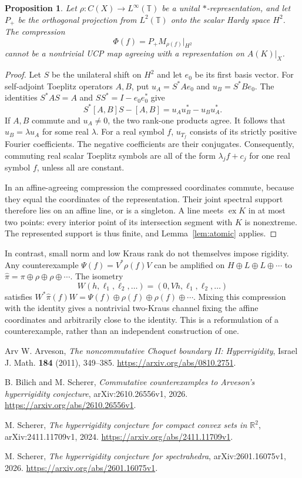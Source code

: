 \documentclass[11pt,letterpaper]{amsart}
\newtheorem{proposition}[theorem]{Proposition}
\theoremstyle{definition}
\theoremstyle{remark}
\numberwithin{equation}{section}
\DeclareMathOperator{\ex}{ex}
\newcommand{\R}{\mathbb R}
\begin{document}
\begin{proposition}\label{nonwalsh:prop:toeplitz}
Let $\rho:C(X)\to L^\infty(\mathbb T)$ be a unital
$*$-representation, and let $P_+$ be the orthogonal projection from
$L^2(\mathbb T)$ onto the scalar Hardy space $H^2$. The compression
\[
                   \Phi(f)=P_+M_{\rho(f)}|_{H^2}
\]
cannot be a nontrivial UCP map agreeing with a representation on
$A(K)|_X$.
\end{proposition}
\begin{proof}
Let $S$ be the unilateral shift on $H^2$ and let $e_0$ be its first
basis vector. For self-adjoint Toeplitz operators $A,B$, put
$u_A=S^*Ae_0$ and $u_B=S^*Be_0$. The identities $S^*AS=A$ and
$SS^*=I-e_0e_0^*$ give
\[
                  S^*[A,B]S-[A,B]=u_Au_B^*-u_Bu_A^*.
\]
If $A,B$ commute and $u_A\ne0$, the two rank-one products agree.
It follows that $u_B=\lambda u_A$ for some real $\lambda$.
For a real symbol $f$, $u_{T_f}$ consists of its strictly positive
Fourier coefficients. The negative coefficients are their conjugates.
Consequently, commuting real scalar Toeplitz symbols are all of the
form $\lambda_jf+c_j$ for one real symbol $f$, unless all are constant.

In an affine-agreeing compression the compressed coordinates commute,
because they equal the coordinates of the representation. Their joint
spectral support therefore lies on an affine line, or is a singleton.
A line meets $\ex K$ in at most two points: every interior point of
its intersection segment with $K$ is nonextreme. The represented
support is thus finite, and Lemma~\ref{lem:atomic} applies.
\end{proof}

In contrast, small norm and low Kraus rank do not themselves impose
rigidity. Any counterexample $\Psi(f)=V^*\rho(f)V$ can be amplified
on $H\oplus L\oplus L\oplus\cdots$ to
$\widehat\pi=\pi\oplus\rho\oplus\rho\oplus\cdots$. The isometry
\[
             W(h,\ell_1,\ell_2,\ldots)=(0,Vh,\ell_1,\ell_2,\ldots)
\]
satisfies
$W^*\widehat\pi(f)W=\Psi(f)\oplus\rho(f)\oplus\rho(f)\oplus\cdots$.
Mixing this compression with the identity gives a nontrivial two-Kraus
channel fixing the affine coordinates and arbitrarily close to the
identity. This is a reformulation of a counterexample, rather than an
independent construction of one.

\begin{thebibliography}{Arv}
W. Arveson, \emph{The noncommutative Choquet boundary II: Hyperrigidity},
Israel J. Math. \textbf{184} (2011), 349--385.
\url{https://arxiv.org/abs/0810.2751}.

B. Bilich and M. Scherer, \emph{Commutative counterexamples to
Arveson's hyperrigidity conjecture}, arXiv:2610.26556v1, 2026.
\url{https://arxiv.org/abs/2610.26556v1}.

M. Scherer, \emph{The hyperrigidity conjecture for compact convex sets
in $\R^2$}, arXiv:2411.11709v1, 2024.
\url{https://arxiv.org/abs/2411.11709v1}.

M. Scherer, \emph{The hyperrigidity conjecture for spectrahedra},
arXiv:2601.16075v1, 2026.
\url{https://arxiv.org/abs/2601.16075v1}.
\end{thebibliography}
\end{document}
